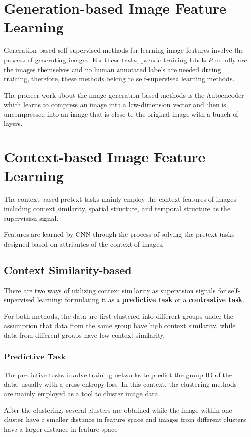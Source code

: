 \section{Generation-based Image Feature Learning}
Generation-based self-supervised methods for learning image features involve the
process of generating images. For these tasks, pseudo training labels $P$ usually
are the images themselves and no human annotated labels are needed during training,
therefore, these methods belong to self-supervised learning methods.

The pioneer work about the image generation-based methods is the Autoencoder which
learns to compress an image into a low-dimension vector and then is uncompressed
into an image that is close to the original image with a bunch of layers.

\section{Context-based Image Feature Learning}
The context-based pretext tasks mainly employ the context features of images
including context similarity, spatial structure, and temporal structure as the
supervision signal.

Features are learned by CNN through the process of solving the pretext tasks
designed based on attributes of the context of images.
\subsection{Context Similarity-based}
There are two ways of utilizing context similarity as supervision signals for
self-supervised learning: formulating it as a \textbf{predictive task} or a
\textbf{contrastive task}.

For both methods, the data are first clustered into different groups under the
assumption that data from the same group have high context similarity, while data
from different groups have low context similarity.
\subsubsection{Predictive Task}
The predictive tasks involve training networks to predict the group ID of the data,
usually with a cross entropy loss. In this context, the clustering methods are
mainly employed as a tool to cluster image data.

After the clustering, several clusters are obtained while the image within one
cluster have a smaller distance in feature space and images from different clusters
have a larger distance in feature space.

